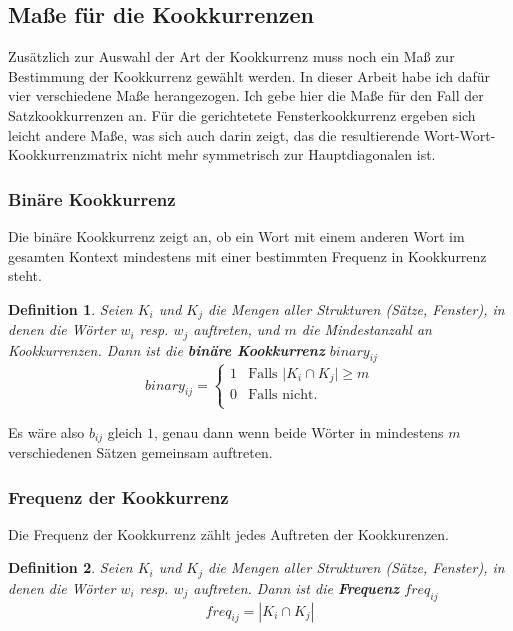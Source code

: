 \documentclass[11pt,numbers=noenddot]{scrartcl}
\newtheorem*{defi}{Definition}
\begin{document}
\subsection{Maße für die Kookkurrenzen} \label{coocmeasures}

Zusätzlich zur Auswahl der Art der Kookkurrenz muss noch ein Maß zur Bestimmung der Kookkurrenz gewählt werden. In dieser Arbeit habe ich dafür vier verschiedene Maße herangezogen. Ich gebe hier die Maße für den Fall der Satzkookkurrenzen an. Für die gerichtetete Fensterkookkurrenz ergeben sich leicht andere Maße, was sich auch darin zeigt, das die resultierende Wort-Wort-Kookkurrenzmatrix nicht mehr symmetrisch zur Hauptdiagonalen ist.

\subsubsection{Binäre Kookkurrenz}

Die binäre Kookkurrenz zeigt an, ob ein Wort mit einem anderen Wort im gesamten Kontext mindestens mit einer bestimmten Frequenz in Kookkurrenz steht.

\begin{defi}
Seien $K_{i}$ und $K_{j}$ die Mengen aller Strukturen (Sätze, Fenster), in denen die Wörter $w_i$ resp. $w_j$ auftreten, und $m$ die Mindestanzahl an Kookkurrenzen. Dann ist die \textbf{binäre Kookkurrenz} $binary_{ij}$
\begin{equation*}
   binary_{ij} =
   \begin{cases}
        1 & \text{Falls |$K_{i} \cap K_{j}| \ge m$}\\
        0 & \text{Falls nicht.}\\
   \end{cases}
\end{equation*}
\end{defi}

Es wäre also $b_{ij}$ gleich $1$, genau dann wenn beide Wörter in mindestens $m$ verschiedenen Sätzen gemeinsam auftreten.

\subsubsection{Frequenz der Kookkurrenz}

Die Frequenz der Kookkurrenz zählt jedes Auftreten der Kookkurenzen.

\begin{defi}
Seien $K_{i}$ und $K_{j}$ die Mengen aller Strukturen (Sätze, Fenster), in denen die Wörter $w_i$ resp. $w_j$ auftreten. Dann ist die \textbf{Frequenz} $freq_{ij}$
\begin{equation*}
   freq_{ij} = |K_{i} \cap K_{j}|
\end{equation*}
\end{defi}
\end{document}
